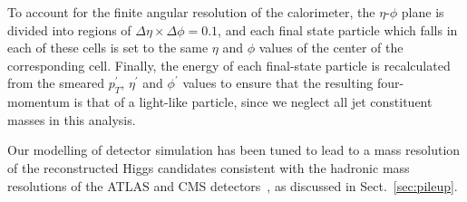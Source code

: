To account for the finite angular resolution of the calorimeter,
the $\eta$-$\phi$ plane is divided into regions of
$\Delta \eta \times \Delta \phi=0.1$, and each final state particle
which falls in each of these cells is set to the same $\eta$
and $\phi$ values of the center of the
corresponding cell.
%
Finally, the energy
of each final-state particle
is recalculated from the smeared $p_T^\prime$,
$\eta^\prime$ and $\phi^\prime$ values to ensure that the resulting
four-momentum is that of a light-like particle, since we neglect all
jet constituent masses in this analysis.


Our modelling of detector simulation has been tuned
to lead to a mass resolution of
the reconstructed Higgs candidates consistent
with the hadronic mass resolutions of the
ATLAS and CMS detectors~\cite{Aad:2012gxa,Chatrchyan:2013zna,Aad:2014xzb},
as discussed in Sect.~\ref{sec:pileup}.

%
